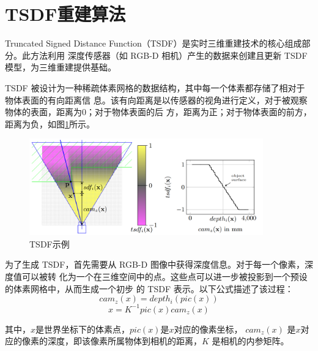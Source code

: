 \section{TSDF重建算法}

\par Truncated Signed Distance Function（TSDF）是实时三维重建技术的核心组成部分。此方法利用
深度传感器（如 RGB-D 相机）产生的数据来创建且更新 TSDF 模型，为三维重建提供基础。

\par TSDF 被设计为一种稀疏体素网格的数据结构，其中每一个体素都存储了相对于物体表面的有向距离信
息。该有向距离是以传感器的视角进行定义，对于被观察物体的表面，距离为0；对于物体表面的后
方，距离为正；对于物体表面的前方，距离为负，如图\ref{fig:tsdf_example}\cite{tsdf}所示。

\begin{figure}[htb]
	\centering
	\includegraphics[width=0.9\textwidth]{figures/tsdf_exp.png}
	\caption{TSDF示例}
	\label{fig:tsdf_example}
\end{figure}

\par 为了生成 TSDF，首先需要从 RGB-D 图像中获得深度信息。对于每一个像素，深度值可以被转
化为一个在三维空间中的点。这些点可以进一步被投影到一个预设的体素网格中，从而生成一个初步
的 TSDF 表示。以下公式描述了该过程：
\begin{equation}
	cam_z(x) = depth_i(pic(x))
\end{equation}
\begin{equation}
	x = K^{-1} pic(x) cam_z(x)
\end{equation}

\par 其中，$x$是世界坐标下的体素点，$pic(x)$是$x$对应的像素坐标，
$cam_z(x)$ 是$x$对应的像素的深度，即该像素所属物体到相机的距离，$K$ 是相机的内参矩阵。

